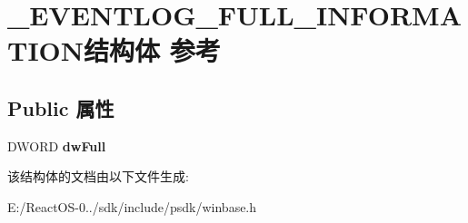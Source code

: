 \hypertarget{struct___e_v_e_n_t_l_o_g___f_u_l_l___i_n_f_o_r_m_a_t_i_o_n}{}\section{\+\_\+\+E\+V\+E\+N\+T\+L\+O\+G\+\_\+\+F\+U\+L\+L\+\_\+\+I\+N\+F\+O\+R\+M\+A\+T\+I\+O\+N结构体 参考}
\label{struct___e_v_e_n_t_l_o_g___f_u_l_l___i_n_f_o_r_m_a_t_i_o_n}
\subsection*{Public 属性}
\begin{DoxyCompactItemize}
\item 
\mbox{\label{struct___e_v_e_n_t_l_o_g___f_u_l_l___i_n_f_o_r_m_a_t_i_o_n_af071bf1e49dbc9c3cadf31dbd1c18aa3}} 
D\+W\+O\+RD {\bfseries dw\+Full}
\end{DoxyCompactItemize}


该结构体的文档由以下文件生成\+:\begin{DoxyCompactItemize}
\item 
E\+:/\+React\+O\+S-\/0../sdk/include/psdk/winbase.\+h\end{DoxyCompactItemize}
